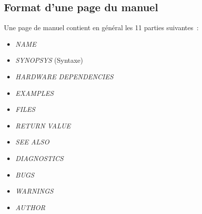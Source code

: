 \subsection{Format d'une page du manuel}

Une page de manuel contient en g{\'e}n{\'e}ral les 11
parties suivantes~:
\begin{itemize}
	\item {\sl NAME}
	\item {\sl SYNOPSYS} (Syntaxe)
	\item {\sl HARDWARE DEPENDENCIES}
	\item {\sl EXAMPLES}
	\item {\sl FILES}
	\item {\sl RETURN VALUE}
	\item {\sl SEE ALSO}
	\item {\sl DIAGNOSTICS}
	\item {\sl BUGS}
	\item {\sl WARNINGS}
	\item {\sl AUTHOR}
\end{itemize}

